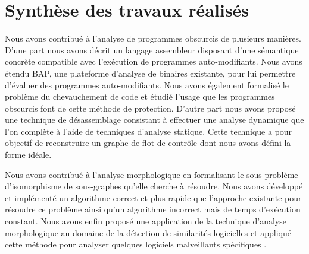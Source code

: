 \section*{Synthèse des travaux réalisés}

Nous avons contribué à l’analyse de programmes obscurcis de plusieurs manières. 
D’une part nous avons décrit un langage assembleur disposant d’une sémantique concrète compatible avec l’exécution de programmes auto-modifiants.
Nous avons étendu BAP, une plateforme d’analyse de binaires existante, pour lui permettre d’évaluer des programmes auto-modifiants.
Nous avons également formalisé le problème du chevauchement de code et étudié l’usage que les programmes obscurcis font de cette méthode de protection. 
D’autre part nous avons proposé une technique de désassemblage consistant à effectuer une analyse dynamique que l’on complète à l’aide de techniques d’analyse statique. 
Cette technique a pour objectif de reconstruire un graphe de flot de contrôle dont nous avons défini la forme idéale.

Nous avons contribué à l’analyse morphologique en formalisant le sous-problème d’isomorphisme de sous-graphes qu’elle cherche à résoudre. Nous avons développé et implémenté un algorithme correct et plus rapide que l'approche existante pour résoudre ce problème ainsi qu’un algorithme incorrect mais de temps d’exécution constant. Nous avons enfin proposé une application de la technique d’analyse morphologique au domaine de la détection de similarités logicielles \cite{REAT12,mal12} et appliqué cette méthode pour analyser quelques logiciels malveillants spécifiques \cite{sstic13,mal13}.

